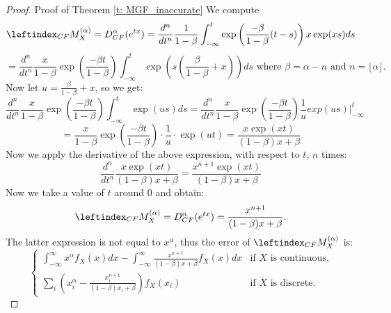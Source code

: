 \begin{proof}
    Proof of Theorem \ref{t: MGF_inaccurate}
    We compute \[\leftindex_{CF}{M}_X^{(\alpha)} = D^\alpha_{CF}(e^{tx}) = \frac{d^n}{dt^n}\frac{1}{1 - \beta}  \int_{-\infty}^{t} \exp\left(\frac{-\beta}{1 - \beta}(t - s)\right) x \exp(xs) ds\]
    \[= \frac{d^n}{dt^n}\frac{x}{1 - \beta} \exp\left(\frac{-\beta t}{1 - \beta}\right) \int_{-\infty}^{t} \exp\left(s\left(\frac{\beta }{1 - \beta} + x \right)\right) ds  \text{ where } \beta = \alpha - n \text{ and } n = \lfloor \alpha \rfloor.\]
    Now let \( \displaystyle u = \frac{\beta}{1 - \beta} + x\), so we get:
    \[\frac{d^n}{dt^n}\frac{x}{1 - \beta} \exp\left(\frac{-\beta t}{1 - \beta}\right) \int_{-\infty}^{t} \exp(us) ds = \frac{d^n}{dt^n}\frac{x}{1 - \beta} \exp\left(\frac{-\beta t}{1 - \beta}\right) \frac{1}{u} exp(us)\Big|_{-\infty}^{t}\]
    \[= \frac{x}{1 - \beta} \exp\left(\frac{-\beta t}{1 - \beta}\right) \cdot \frac{1}{u} \cdot \exp(u t) = \frac{x \exp(xt)}{(1 - \beta)x + \beta}\]
    Now we apply the derivative of the above expression, with respect to \(t\), \(n\) times:
    \[\frac{d^n}{d t^n} \frac{x \exp(xt)}{(1 - \beta)x + \beta} = \frac{x^{n+1} \exp(xt)}{(1 - \beta)x + \beta}\]
    Now we take a value of \(t\) around 0 and obtain:
    \[\leftindex_{CF}{M}_X^{(\alpha)} = D^\alpha_{CF}(e^{tx}) = \frac{x^{n+1} }{(1 - \beta)x + \beta}.\]
    The latter expression is not equal to \(x^\alpha\), thus the error of \(\leftindex_{CF}{M}_X^{(\alpha)}\) is:
    \[
    \begin{cases} 
    \displaystyle \int_{-\infty}^{\infty} x^\alpha  f_X(x) dx -  \displaystyle \int_{-\infty}^{\infty}  \frac{x^{n+1} }{(1 - \beta)x + \beta} f_X(x) dx & \text{if } X \text{ is continuous,} \\ 
    \displaystyle \sum_{i} \left(x_i^\alpha -  \frac{x_i^{n+1} }{(1 - \beta)x_i + \beta}\right) f_X(x_i) & \text{if } X \text{ is discrete.} 
\end{cases}\]

\end{proof}

\clearpage

